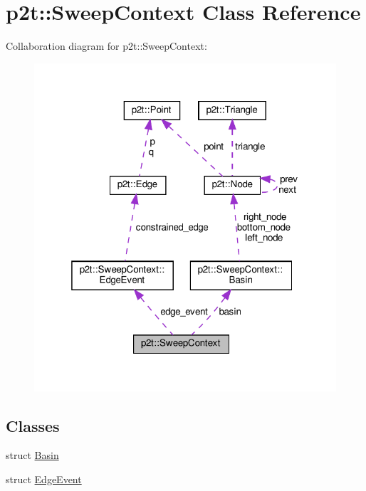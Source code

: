 \hypertarget{classp2t_1_1SweepContext}{}\section{p2t\+:\+:Sweep\+Context Class Reference}
\label{classp2t_1_1SweepContext}


Collaboration diagram for p2t\+:\+:Sweep\+Context\+:
\nopagebreak
\begin{figure}[H]
\begin{center}
\leavevmode
\includegraphics[width=319pt]{classp2t_1_1SweepContext__coll__graph}
\end{center}
\end{figure}
\subsection*{Classes}
\begin{DoxyCompactItemize}
\item 
struct \hyperlink{structp2t_1_1SweepContext_1_1Basin}{Basin}
\item 
struct \hyperlink{structp2t_1_1SweepContext_1_1EdgeEvent}{Edge\+Event}
\end{DoxyCompactItemize}
